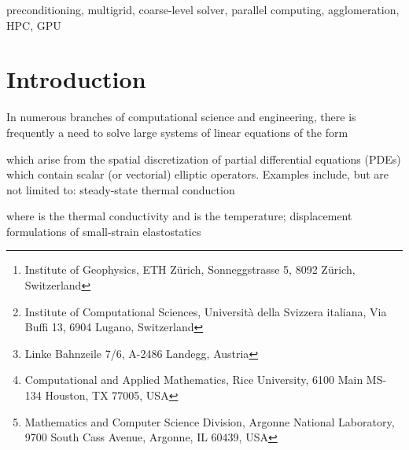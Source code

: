 \documentclass[]{siamart0216}
\title{{\TheTitle}}
\author{
Dave A. May
       \thanks{Institute of Geophysics, ETH Z{\"u}rich, 
       Sonneggstrasse 5, 8092 Z{\"u}rich, Switzerland
       \email{dave.may@erdw.ethz.ch}}
\and
Patrick Sanan
       \thanks{Institute of Computational Sciences, 
       Universit{\`a} della Svizzera italiana, 
       Via Buffi 13, 6904 Lugano, Switzerland
       \email{patrick.sanan@usi.ch}}
\and
Karl Rupp
       \thanks{Linke Bahnzeile 7/6, 
       A-2486 Landegg, Austria
       \email{me@karlrupp.net}}
\and  Matthew G. Knepley
       \thanks{Computational and Applied Mathematics, Rice University, 
       6100 Main MS-134
       Houston, TX 77005, USA
       \email{knepley@rice.edu}}
\and
Barry F. Smith
       \thanks{Mathematics and Computer Science Division, 
       Argonne National Laboratory, 
       9700 South Cass Avenue, 
       Argonne, IL 60439, USA
       \email{bsmith@mcs.anl.gov}}
}
\begin{document}
\maketitle

\begin{abstract}
Elliptic partial differential equations (PDEs) frequently arise in continuum descriptions of physical processes relevant to science and engineering. 
Multilevel preconditioners represent a family of scalable techniques for solving discrete PDEs of this type and thus 
are the method of choice for high-resolution simulations.
The scalability and time-to-solution of massively parallel multilevel preconditioners can be adversely effected 
by using a coarse-level solver with sub-optimal algorithmic complexity.
To maintain scalability, agglomeration techniques applied to the coarse level have been shown to be necessary.

In this work, we present a new software component introduced within the 
Portable Extensible Toolkit for Scientific computation (PETSc) which permits agglomeration. 
We provide an overview of the design and implementation of this functionality, 
together with several use cases highlighting the benefits of agglomeration. 
Lastly, we demonstrate via numerical experiments employing geometric multigrid with structured meshes,
 the flexibility 
and performance gains possible using our MPI-rank agglomeration implementation.
\end{abstract}


\begin{keywords}
	preconditioning, multigrid, coarse-level solver, parallel computing, agglomeration, HPC, GPU
\end{keywords}



\section{Introduction} \label{sec:intro}


In numerous branches of computational science and engineering, there is frequently a need to solve 
large systems of linear equations of the form

which arise from the spatial discretization of partial differential equations (PDEs) which contain scalar (or vectorial) elliptic operators. 
Examples include, but are not limited to: steady-state thermal conduction

where  is the thermal conductivity and  is the temperature; 
displacement  formulations of small-strain elastostatics
\end{document}
